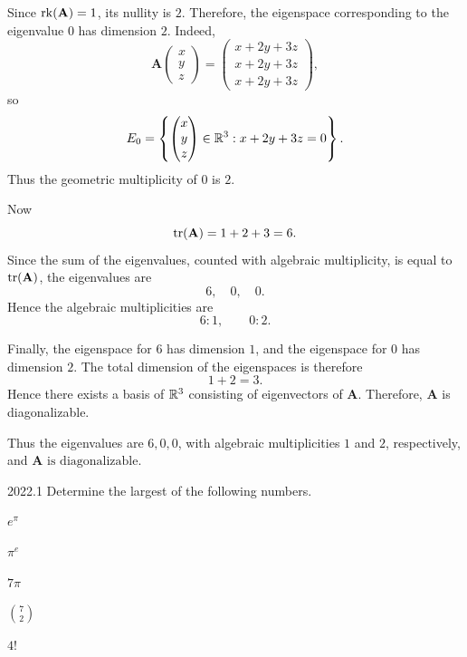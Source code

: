 \begin{solution}
        Since $\operatorname{rk}(\mathbf{A})=1$, its nullity is $2$. Therefore, the eigenspace corresponding to
        the eigenvalue $0$ has dimension $2$. Indeed,
        \[
            \mathbf{A}
            \begin{pmatrix}
                x \\
                y \\
                z
            \end{pmatrix}
            =
            \begin{pmatrix}
                x+2y+3z \\
                x+2y+3z \\
                x+2y+3z
            \end{pmatrix},
        \]
        so
        \[
            E_0
            =
            \left\{
                \begin{pmatrix}
                    x \\
                    y \\
                    z
                \end{pmatrix}
                \in \mathbb{R}^3
                :
                x+2y+3z=0
            \right\}.
        \]
        Thus the geometric multiplicity of $0$ is $2$.

        Now
        \[
            \operatorname{tr}(\mathbf{A})=1+2+3=6.
        \]
        Since the sum of the eigenvalues, counted with algebraic multiplicity, is equal to
        $\operatorname{tr}(\mathbf{A})$, the eigenvalues are
        \[
            6,\quad 0,\quad 0.
        \]
        Hence the algebraic multiplicities are
        \[
            6:1,
            \qquad
            0:2.
        \]

        Finally, the eigenspace for $6$ has dimension $1$, and the eigenspace for $0$ has dimension
        $2$. The total dimension of the eigenspaces is therefore
        \[
            1+2=3.
        \]
        Hence there exists a basis of $\mathbb{R}^3$ consisting of eigenvectors of $\mathbf{A}$. Therefore,
        $\mathbf{A}$ is diagonalizable.

        Thus the eigenvalues are $\boxed{6,0,0}$, with algebraic
        multiplicities $1$ and $2$, respectively, and
        $\boxed{\mathbf{A}\text{ is diagonalizable}}$.
    \end{solution}

    \begin{pastproblem}{2022.1}
        Determine the largest of the following numbers.
        \begin{problemchoices}
            \item \(e^\pi\)
            \item \(\pi^e\)
            \item $7\pi$
            \item \(\binom{7}{2}\)
            \item \(4!\)
        \end{problemchoices}
    \end{pastproblem}

